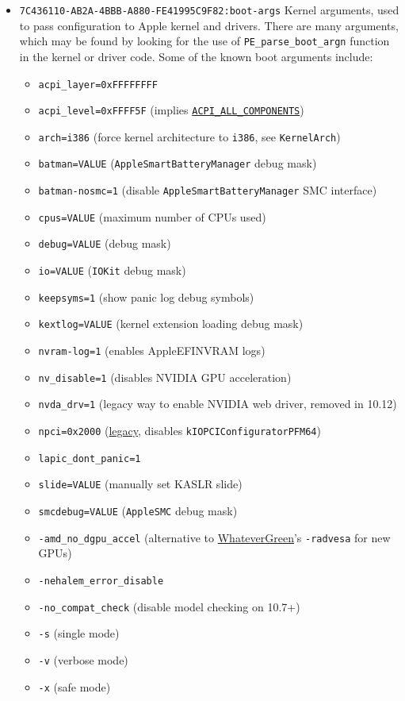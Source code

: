 \documentclass[]{article}
\providecommand{\tightlist}{%
  \setlength{\itemsep}{0pt}\setlength{\parskip}{0pt}}
\begin{document}
\begin{itemize}
\tightlist
\item
  \texttt{7C436110-AB2A-4BBB-A880-FE41995C9F82:boot-args}
  \break
  Kernel arguments, used to pass configuration to Apple kernel and drivers.
  There are many arguments, which may be found by looking for the use of
  \texttt{PE\_parse\_boot\_argn} function in the kernel or driver code.
  Some of the known boot arguments include:

  \begin{itemize}
  \item \texttt{acpi\_layer=0xFFFFFFFF}
  \item \texttt{acpi\_level=0xFFFF5F} (implies
    \href{https://github.com/acpica/acpica/blob/master/source/include/acoutput.h}
    {\texttt{ACPI\_ALL\_COMPONENTS}})
  \item \texttt{arch=i386} (force kernel architecture to \texttt{i386}, see \texttt{KernelArch})
  \item \texttt{batman=VALUE} (\texttt{AppleSmartBatteryManager} debug mask)
  \item \texttt{batman-nosmc=1} (disable \texttt{AppleSmartBatteryManager} SMC interface)
  \item \texttt{cpus=VALUE} (maximum number of CPUs used)
  \item \texttt{debug=VALUE} (debug mask)
  \item \texttt{io=VALUE} (\texttt{IOKit} debug mask)
  \item \texttt{keepsyms=1} (show panic log debug symbols)
  \item \texttt{kextlog=VALUE} (kernel extension loading debug mask)
  \item \texttt{nvram-log=1} (enables AppleEFINVRAM logs)
  \item \texttt{nv\_disable=1} (disables NVIDIA GPU acceleration)
  \item \texttt{nvda\_drv=1} (legacy way to enable NVIDIA web driver, removed in 10.12)
  \item \texttt{npci=0x2000} (\href{https://www.insanelymac.com/forum/topic/260539-1068-officially-released/?do=findComment&comment=1707972}{legacy}, disables \texttt{kIOPCIConfiguratorPFM64})
  \item \texttt{lapic\_dont\_panic=1}
  \item \texttt{slide=VALUE} (manually set KASLR slide)
  \item \texttt{smcdebug=VALUE} (\texttt{AppleSMC} debug mask)
  \item \texttt{-amd\_no\_dgpu\_accel} (alternative to \href{https://github.com/acidanthera/WhateverGreen}{WhateverGreen}'s \texttt{-radvesa} for new GPUs)
  \item \texttt{-nehalem\_error\_disable}
  \item \texttt{-no\_compat\_check} (disable model checking on 10.7+)
  \item \texttt{-s} (single mode)
  \item \texttt{-v} (verbose mode)
  \item \texttt{-x} (safe mode)
  \end{itemize}


\end{itemize}
\end{document}
